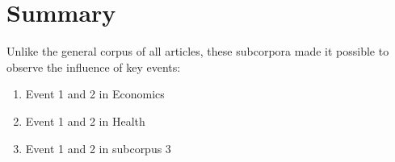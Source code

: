 \section{Summary}

	Unlike the general corpus of all articles, these subcorpora made it possible to observe the influence of key events:

	\begin{enumerate}
		\item Event 1 and 2 in Economics
		\item Event 1 and 2 in Health
		\item Event 1 and 2 in subcorpus 3
	\end{enumerate}





%